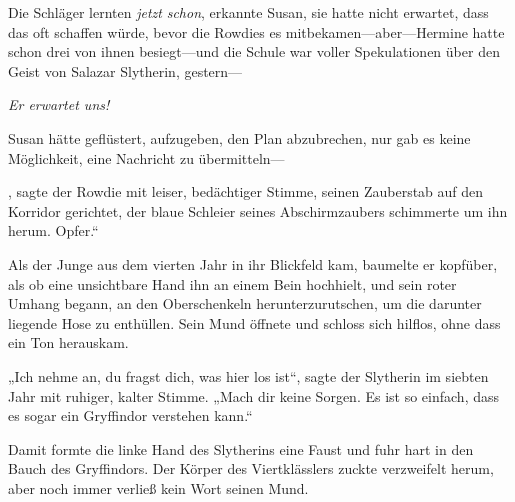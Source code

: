 Die Schläger lernten \emph{jetzt} \emph{schon}, erkannte Susan, sie hatte nicht erwartet, dass \SPHEW das oft schaffen würde, bevor die Rowdies es mitbekamen—aber—Hermine hatte schon drei von ihnen besiegt—und die Schule war voller Spekulationen über den Geist von Salazar Slytherin, gestern—

\emph{Er erwartet uns!}

Susan hätte geflüstert, aufzugeben, den Plan abzubrechen, nur gab es keine Möglichkeit, eine Nachricht zu übermitteln—

, sagte der Rowdie mit leiser, bedächtiger Stimme, seinen Zauberstab auf den Korridor gerichtet, der blaue Schleier seines Abschirmzaubers schimmerte um ihn herum.  Opfer.“

Als der Junge aus dem vierten Jahr in ihr Blickfeld kam, baumelte er kopfüber, als ob eine unsichtbare Hand ihn an einem Bein hochhielt, und sein roter Umhang begann, an den Oberschenkeln herunterzurutschen, um die darunter liegende Hose zu enthüllen. Sein Mund öffnete und schloss sich hilflos, ohne dass ein Ton herauskam.

„Ich nehme an, du fragst dich, was hier los ist“, sagte der Slytherin im siebten Jahr mit ruhiger, kalter Stimme. „Mach dir keine Sorgen. Es ist so einfach, dass es sogar ein Gryffindor verstehen kann.“

Damit formte die linke Hand des Slytherins eine Faust und fuhr hart in den Bauch des Gryffindors. Der Körper des Viertklässlers zuckte verzweifelt herum, aber noch immer verließ kein Wort seinen Mund.

